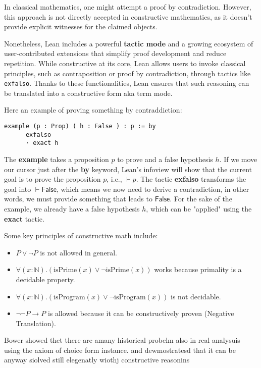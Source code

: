 In classical mathematics, one might attempt a proof by contradiction. However, this approach is not 
directly accepted in constructive mathematics, as it doesn't provide explicit witnesses for the claimed objects.

Nonetheless, Lean includes a powerful \textbf{tactic mode} and a growing ecosystem of 
user-contributed extensions that simplify proof development and reduce repetition. 
While constructive at its core, Lean allows users to invoke classical principles, 
such as contraposition or proof by contradiction, through tactics like \lstinline|exfalso|. 
Thanks to these functionalities, Lean ensures that such reasoning can be translated 
into a constructive form aka term mode. 

\begin{example}
Here an example of proving something by contraddiction:
   \begin{lstlisting}[language=Lean]
    example (p : Prop) ( h : False ) : p := by
      exfalso
      · exact h
\end{lstlisting} 
The \textbf{example} takes a proposition $p$ to prove and a false hypothesis $h$.  
If we move our cursor just after the \textbf{by} keyword, Lean's infoview will show that the current goal is to prove the proposition $p$, i.e., $\vdash p$.  
The tactic \textbf{exfalso} transforms the goal into $\vdash \mathsf{False}$, which means we now need to derive a contradiction, in other words, we must provide something that leads to $\mathsf{False}$.  
For the sake of the example, we already have a false hypothesis $h$, which can be "applied" using the \textbf{exact} tactic.

\end{example}

Some key principles of constructive math include:
\begin{itemize}
    \item $P \lor \neg P$ is not allowed in general.
    \item $\forall (x: \mathbb{N}) . (\text{isPrime}(x) \lor \neg \text{isPrime}(x))$ works because primality is a decidable property.
    \item $\forall (x: \mathbb{N}) . (\text{isProgram}(x) \lor \neg \text{isProgram}(x))$ is not decidable.
    \item $\neg \neg P \to P$ is allowed because it can be constructively proven (Negative Translation).
\end{itemize}


Bower showed thet there are amany historical probelm also in real analysuis using the axiom of 
choice form instance. and dewmostratesd that it can be anyway siolved still elegenatly wiothj constructive reasonins
\cite{thompson1999types}